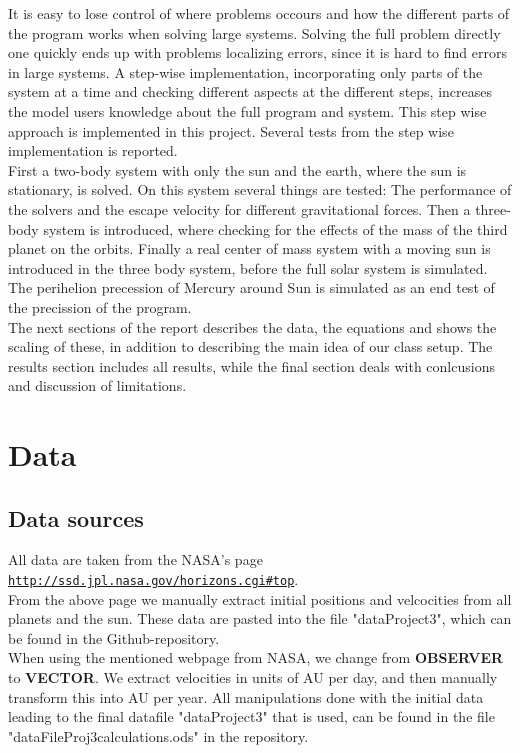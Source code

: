\documentclass{article}
\begin{document}
It is easy to lose control of where problems occours and how the different parts of the program works when solving large systems. Solving the full problem directly one quickly ends up with problems localizing errors, since it is hard to find errors in large systems. A step-wise implementation, incorporating only parts of the system at a time and checking different aspects at the different steps, increases the model users knowledge about the full program and system. This step wise approach is implemented in this project. Several tests from the step wise implementation is reported.\\

First a two-body system with only the sun and the earth, where the sun is stationary, is solved. On this system several things are tested: The performance of the solvers and the escape velocity for different gravitational forces. Then a three-body system is introduced, where checking for the effects of the mass of the third planet on the orbits. Finally a real center of mass system with a moving sun is introduced in the three body system, before the full solar system is simulated. The perihelion precession of Mercury around Sun is simulated as an end test of the precission of the program.\\

The next sections of the report describes the data, the equations and shows the scaling of these, in addition to describing the main idea of our class setup. The results section includes all results, while the final section deals with conlcusions and discussion of limitations.


\section{Data}

\subsection{Data sources}
All data are taken from the NASA's page \href{{http://ssd.jpl.nasa.gov/horizons.cgi#top}}{\nolinkurl{http://ssd.jpl.nasa.gov/horizons.cgi\#top}}.\\

From the above page we manually extract initial positions and velcocities from all planets and the sun. These data are pasted into the file "dataProject3", which can be found in the Github-repository.\\

When using the mentioned webpage from NASA, we change from \textbf{OBSERVER} to \textbf{VECTOR}. We extract velocities in units of AU per day, and then manually transform this into AU per year. All manipulations done with the initial data leading to the final datafile "dataProject3" that is used, can be found in the file "dataFileProj3calculations.ods" in the repository.
\end{document}
